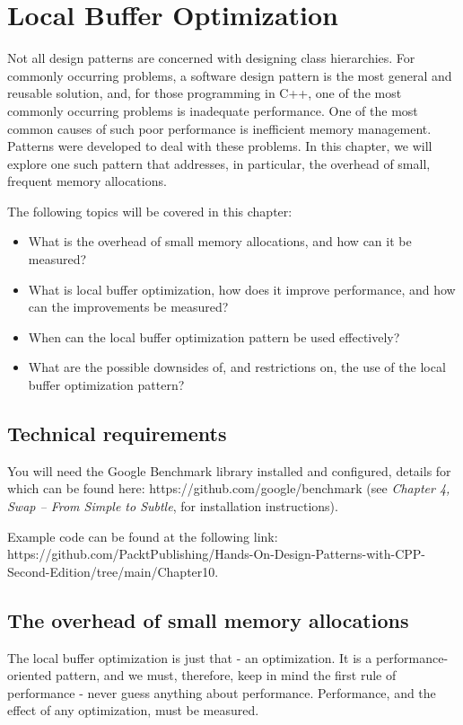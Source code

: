 ﻿\chapter{Local Buffer Optimization}

Not all design patterns are concerned with designing class hierarchies. For commonly occurring problems, a software design pattern is the most general and reusable solution, and, for those programming in C++, one of the most commonly occurring problems is inadequate performance. One of the most common causes of such poor performance is inefficient memory management. Patterns were developed to deal with these problems. In this chapter, we will explore one such pattern that addresses, in particular, the overhead of small, frequent memory allocations.

The following topics will be covered in this chapter:

\begin{itemize}
\item
  What is the overhead of small memory allocations, and how can it be measured?
\item
  What is local buffer optimization, how does it improve performance, and how can the improvements be measured?
\item
  When can the local buffer optimization pattern be used effectively?
\item
  What are the possible downsides of, and restrictions on, the use of the local buffer optimization pattern?
\end{itemize}

\section{Technical requirements}

You will need the Google Benchmark library installed and configured, details for which can be found here: https://github.com/google/benchmark (see \emph{Chapter 4, Swap -- From Simple to Subtle}, for installation instructions).

Example code can be found at the following link: https://github.com/PacktPublishing/Hands-On-Design-Patterns-with-CPP-Second-Edition/tree/main/Chapter10.

\section{The overhead of small memory allocations}

The local buffer optimization is just that - an optimization. It is a performance-oriented pattern, and we must, therefore, keep in mind the first rule of performance - never guess anything about performance. Performance, and the effect of any optimization, must be measured.

